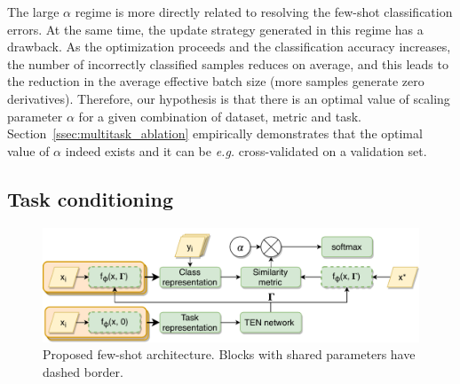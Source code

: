 \documentclass{article}
\begin{document}
The large $\alpha$ regime is more directly related to resolving the few-shot classification errors. At the same time, the update strategy generated in this regime has a drawback. As the optimization proceeds and the classification accuracy increases, the number of incorrectly classified samples reduces on average, and this leads to the reduction in the average effective batch size (more samples generate zero derivatives). Therefore, our hypothesis is that there is an optimal value of scaling parameter $\alpha$ for a given combination of dataset, metric and task. Section~\ref{ssec:multitask_ablation} empirically demonstrates that the optimal value of $\alpha$ indeed exists and it can be \emph{e.g.} cross-validated on a validation set.


\subsection{Task conditioning} \label{ssec:tbn_architechture}
\begin{figure}[t]
    \centering
    \includegraphics[width=\textwidth]{cbn_neural_net.pdf}
    \caption{Proposed few-shot architecture. Blocks with shared parameters have dashed border.}
    \label{fig:cbn_architecture}
\end{figure}
\end{document}

